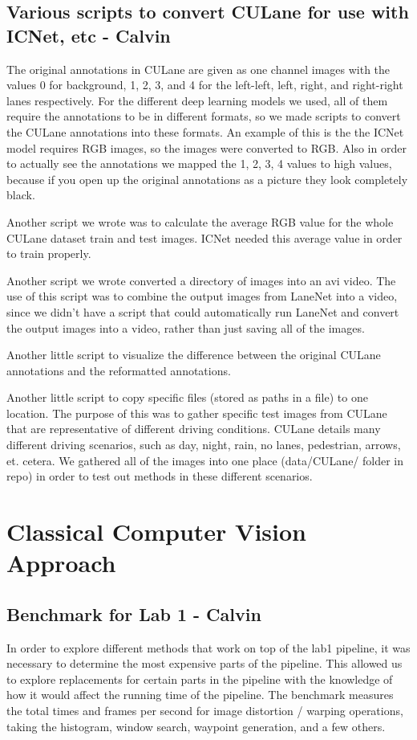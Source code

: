 \documentclass[twoside,twocolumn]{article}
\begin{document}
\subsection{Various scripts to convert CULane for use with ICNet, etc - Calvin}
\par The original annotations in CULane are given as one channel images with the values 0 for background, 1, 2, 3, and 4 for the left-left, left, right, and right-right lanes respectively. For the different deep learning models we used, all of them require the annotations to be in different formats, so we made scripts to convert the CULane annotations into these formats. An example of this is the the ICNet model requires RGB images, so the images were converted to RGB. Also in order to actually see the annotations we mapped the 1, 2, 3, 4 values to high values, because if you open up the original annotations as a picture they look completely black.
\par Another script we wrote was to calculate the average RGB value for the whole CULane dataset train and test images. ICNet needed this average value in order to train properly.
\par Another script we wrote converted a directory of images into an avi video. The use of this script was to combine the output images from LaneNet into a video, since we didn't have a script that could automatically run LaneNet and convert the output images into a video, rather than just saving all of the images.
\par Another little script to visualize the difference between the original CULane annotations and the reformatted annotations.
\par Another little script to copy specific files (stored as paths in a file) to one location. The purpose of this was to gather specific test images from CULane that are representative of different driving conditions. CULane details many different driving scenarios, such as day, night, rain, no lanes, pedestrian, arrows, et. cetera. We gathered all of the images into one place (data/CULane/ folder in repo) in order to test out methods in these different scenarios.



\section{Classical Computer Vision Approach}

\subsection{Benchmark for Lab 1 - Calvin}
\par In order to explore different methods that work on top of the lab1 pipeline, it was necessary to determine the most expensive parts of the pipeline. This allowed us to explore replacements for certain parts in the pipeline with the knowledge of how it would affect the running time of the pipeline. The benchmark measures the total times and frames per second for image distortion / warping operations, taking the histogram, window search, waypoint generation, and a few others.
\end{document}
